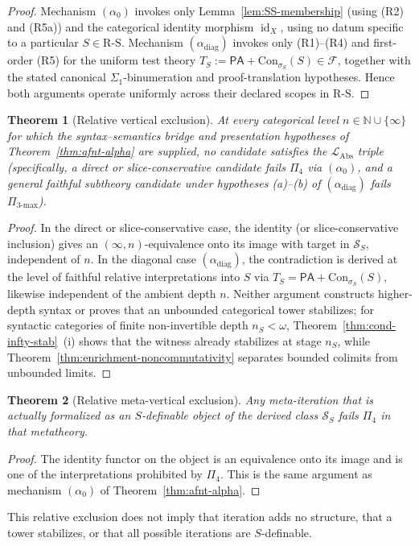 \documentclass[11pt]{article}
\theoremstyle{plain}
\newtheorem{theorem}{Theorem}[section]
\theoremstyle{definition}
\newcommand{\RS}{\mathrm{R\text{-}S}}
\newcommand{\cS}{\mathcal{S}}
\newcommand{\cF}{\mathcal{F}}
\newcommand{\LAbs}{\mathcal{L}_{\mathrm{Abs}}}
\newcommand{\Con}{\mathrm{Con}}
\newcommand{\PA}{\mathsf{PA}}
\DeclareMathOperator{\id}{id}
\begin{document}
\begin{proof}
Mechanism $(\alpha_0)$ invokes only Lemma~\ref{lem:SS-membership} (using (R2) and (R5a)) and the categorical identity morphism $\id_X$, using no datum specific to a particular $S \in \RS$. Mechanism $(\alpha_{\mathrm{diag}})$ invokes only (R1)--(R4) and first-order (R5) for the uniform test theory $T_S := \PA + \Con_{\sigma_S}(S) \in \cF$, together with the stated canonical $\Sigma_1$-binumeration and proof-translation hypotheses. Hence both arguments operate uniformly across their declared scopes in $\RS$.
\end{proof}

\begin{theorem}[Relative vertical exclusion]\label{thm:vertical}
At every categorical level $n \in \mathbb{N} \cup \{\infty\}$ for which the syntax--semantics bridge and presentation hypotheses of Theorem~\ref{thm:afnt-alpha} are supplied, no candidate satisfies the $\LAbs$ triple (specifically, a direct or slice-conservative candidate fails $\Pi_4$ via $(\alpha_0)$, and a general faithful subtheory candidate under hypotheses (a)--(b) of $(\alpha_{\mathrm{diag}})$ fails $\Pi_{3\text{-max}}$).
\end{theorem}
\begin{proof}
In the direct or slice-conservative case, the identity (or slice-conservative inclusion) gives an $(\infty, n)$-equivalence onto its image with target in $\cS_S$, independent of $n$. In the diagonal case $(\alpha_{\mathrm{diag}})$, the contradiction is derived at the level of faithful relative interpretations into $S$ via $T_S = \PA + \Con_{\sigma_S}(S)$, likewise independent of the ambient depth $n$. Neither argument constructs higher-depth syntax or proves that an unbounded categorical tower stabilizes; for syntactic categories of finite non-invertible depth $n_S < \omega$, Theorem~\ref{thm:cond-infty-stab}~(i) shows that the witness already stabilizes at stage $n_S$, while Theorem~\ref{thm:enrichment-noncommutativity} separates bounded colimits from unbounded limits.
\end{proof}

\begin{theorem}[Relative meta-vertical exclusion]\label{thm:meta-vertical}
Any meta-iteration that is actually formalized as an $S$-definable object
of the derived class $\cS_S$ fails $\Pi_4$ in that metatheory.
\end{theorem}
\begin{proof}
The identity functor on the object is an equivalence onto its image and
is one of the interpretations prohibited by $\Pi_4$. This is the same
argument as mechanism $(\alpha_0)$ of Theorem~\ref{thm:afnt-alpha}.
\end{proof}
This relative exclusion does not imply that iteration adds no structure,
that a tower stabilizes, or that all possible iterations are $S$-definable.
\end{document}
